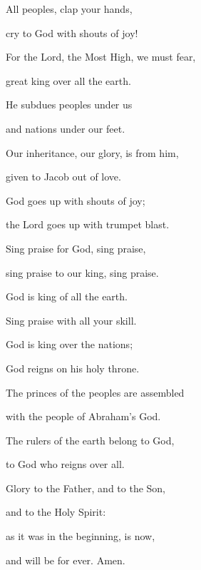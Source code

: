 \noindent All peoples, clap your hands,~\GreStar{}~\nopagebreak

cry to God with shouts of joy!

\noindent For the Lord, the Most High, we must fear,~\GreStar{}~\nopagebreak

great king over all the earth.

\noindent He subdues peoples under us~\GreStar{}~\nopagebreak

and nations under our feet.

\noindent Our inheritance, our glory, is from him,~\GreStar{}~\nopagebreak

given to Jacob out of love.

\noindent God goes up with shouts of joy;~\GreStar{}~\nopagebreak

the Lord goes up with trumpet blast.

\noindent Sing praise for God, sing praise,~\GreStar{}~\nopagebreak

sing praise to our king, sing praise.

\noindent God is king of all the earth.~\GreStar{}~\nopagebreak

Sing praise with all your skill.

\noindent God is king over the nations;~\GreStar{}~\nopagebreak

God reigns on his holy throne.

\noindent The princes of the peoples are assembled~\GreStar{}~\nopagebreak

with the people of Abraham’s God.

\noindent The rulers of the earth belong to God,~\GreStar{}~\nopagebreak

to God who reigns over all.

\noindent Glory to the Father, and to the Son,~\GreStar{}~\nopagebreak

and to the Holy Spirit:

\noindent as it was in the beginning, is now,~\GreStar{}~\nopagebreak

and will be for ever. Amen.
